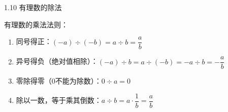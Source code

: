\documentclass[aspectratio=169]{ctexbeamer} %
\date{\today}
\begin{document}
\begin{frame}[t]{1.10 有理数的除法}
\begin{spacing}{1.2}
\normalsize
有理数的乘法法则：
\begin{enumerate}[label={\arabic*.}]
\item 同号得正：$(-a) ÷  (-b)  = a  ÷  b = \dfrac{a}{b}$
\item 异号得负（绝对值相除）：$(-a)÷b  = a÷(-b) = -a÷b = -\dfrac{a}{b}$
\item 零除得零（0不能为除数）：$0 ÷  a = 0$
\item 除以一数，等于乘其倒数：$a ÷ b = a  \cdot \dfrac{1}{b} = \dfrac{a}{b}$
\end{enumerate}

\end{spacing}
\end{frame}
\end{document}
